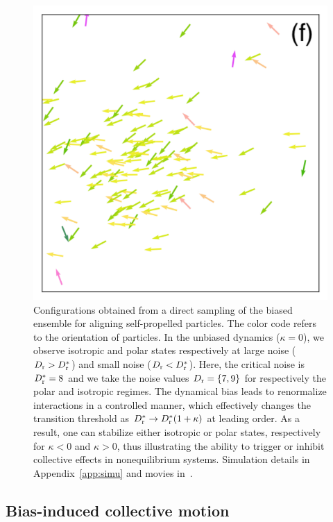 \documentclass[superscriptaddress, twocolumn, prx, longbibliography, nofootinbib]{revtex4-1}
\begin{document}
\begin{figure}
	\includegraphics[width=.318\linewidth]{snap_km02D7.pdf}
	\caption{\label{fig:vicsek}
		Configurations obtained from a direct sampling of the biased ensemble for aligning self-propelled particles. The color code refers to the orientation of particles. In the unbiased dynamics ($\kappa=0$), we observe isotropic and polar states respectively at large noise ($D_{\rm r}>D_{\rm r}^*$) and small noise ($D_{\rm r}<D_{\rm r}^*$). Here, the critical noise is $D_{\rm r}^*=8$ and we take the noise values $D_{\rm r}=\{7,9\}$ for respectively the polar and isotropic regimes. The dynamical bias leads to renormalize interactions in a controlled manner, which effectively changes the transition threshold as $D_{\rm r}^*\to D_{\rm r}^*(1+\kappa)$ at leading order. As a result, one can stabilize either isotropic or polar states, respectively for $\kappa<0$ and $\kappa>0$, thus illustrating the ability to trigger or inhibit collective effects in nonequilibrium systems.
		Simulation details in Appendix~\ref{app:simu} and movies in~\cite{movie}.
}
\end{figure}


\subsection{Bias-induced collective motion}\label{sec:vicsek}
\end{document}
